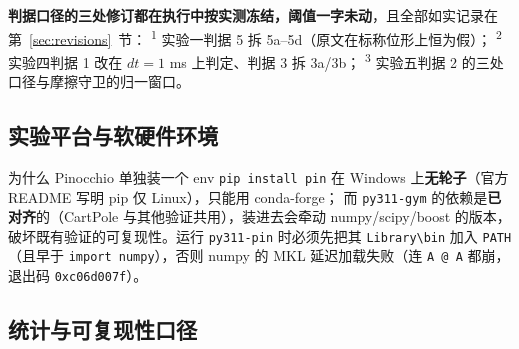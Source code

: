 \documentclass[11pt,a4paper]{ctexart}
\newcommand{\stage}[1]{\textsuperscript{#1}}
\begin{document}
\textbf{判据口径的三处修订都在执行中按实测冻结，阈值一字未动}，且全部如实记录在第~\ref{sec:revisions}~节：
\stage{1} 实验一判据 5 拆 5a--5d（原文在标称位形上恒为假）；
\stage{2} 实验四判据 1 改在 $dt=1$ ms 上判定、判据 3 拆 3a/3b；
\stage{3} 实验五判据 2 的三处口径与摩擦守卫的归一窗口。

\subsection{实验平台与软硬件环境}

\begin{table}[H]
\centering
\small
{}
\end{table}

\begin{keybox}{为什么 Pinocchio 单独装一个 env}
\texttt{pip install pin} 在 Windows 上\textbf{无轮子}（官方 README 写明 pip 仅 Linux），只能用 conda-forge；
而 \texttt{py311-gym} 的依赖是\textbf{已对齐}的（CartPole 与其他验证共用），装进去会牵动
numpy/scipy/boost 的版本，破坏既有验证的可复现性。运行 \texttt{py311-pin} 时必须先把其
\texttt{Library\textbackslash bin} 加入 \texttt{PATH}（且早于 \texttt{import numpy}），否则 numpy 的 MKL
延迟加载失败（连 \texttt{A @ A} 都崩，退出码 \texttt{0xc06d007f}）。
\end{keybox}

\subsection{统计与可复现性口径}
\end{document}
